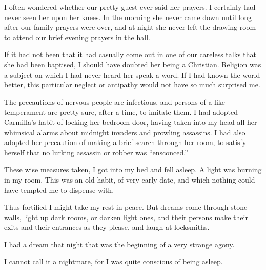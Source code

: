 \documentclass[11pt,twoside,makeidx,hidelinks,]{memoir}
\begin{document}
I often wondered whether our pretty guest ever said her prayers. I
certainly had never seen her upon her knees. In the morning she never
came down until long after our family prayers were over, and at night
she never left the drawing room to attend our brief evening prayers
in the hall.

If it had not been that it had casually come out in one of our careless
talks that she had been baptised, I should have doubted her being a
Christian. Religion was a subject on which I had never heard her speak a
word. If I had known the world better, this particular neglect or
antipathy would not have so much surprised me.

The precautions of nervous people are infectious, and persons of a like
temperament are pretty sure, after a time, to imitate them. I had
adopted Carmilla's habit of locking her bedroom door, having taken into
my head all her whimsical alarms about midnight invaders and prowling
assassins. I had also adopted her precaution of making a brief search
through her room, to satisfy herself that no lurking assassin or robber
was ``ensconced.''

These wise measures taken, I got into my bed and fell asleep. A light
was burning in my room. This was an old habit, of very early date, and
which nothing could have tempted me to dispense with.

Thus fortified I might take my rest in peace. But dreams come through
stone walls, light up dark rooms, or darken light ones, and their
persons make their exits and their entrances as they please, and laugh
at locksmiths.

I had a dream that night that was the beginning of a very strange agony.

I cannot call it a nightmare, for I was quite conscious of being asleep.
\end{document}
